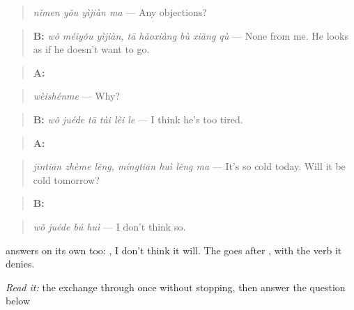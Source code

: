 \begin{quote}
\emph{nǐmen yǒu yìjiàn ma} — Any objections?
\end{quote}

\begin{quote}
\textbf{B:} \emph{wǒ méiyǒu yìjiàn, tā hǎoxiàng bù xiǎng qù} — None from me. He looks as if he doesn't want to go.
\end{quote}

\begin{quote}
\textbf{A:} 
\end{quote}

\begin{quote}
\emph{wèishénme} — Why?
\end{quote}

\begin{quote}
\textbf{B:} \emph{wǒ juéde tā tài lèi le} — I think he's too tired.
\end{quote}

\begin{quote}
\textbf{A:}  
\end{quote}

\begin{quote}
\emph{jīntiān zhème lěng, míngtiān huì lěng ma} — It's so cold today. Will it be cold tomorrow?
\end{quote}

\begin{quote}
\textbf{B:} 
\end{quote}

\begin{quote}
\emph{wǒ juéde bú huì} — I don't think so.
\end{quote}

 answers on its own too: , I don't think it will. The  goes after , with the verb it denies.

\begin{tcolorbox}[breakable,skin=enhanced,colback=orange!6,colframe=orange!45!black,boxrule=0.5pt,arc=1mm,left=6pt,right=6pt,top=4pt,bottom=4pt,fonttitle=\bfseries,title={Read this}]
\emph{Read it:} the exchange through once without stopping, then answer the question below
\end{tcolorbox}

